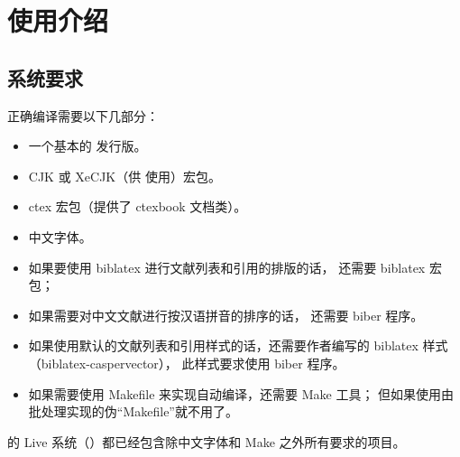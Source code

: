 %
%
%
%

\chapter{使用介绍}
\section{系统要求}\label{sec:req}

正确编译需要以下几部分：
\begin{itemize}
	\item 一个基本的  发行版。
	\item CJK 或 XeCJK（供  使用）宏包。
	\item ctex\supercite{ctex} 宏包（提供了 ctexbook 文档类）。
	\item 中文字体。
	\item 如果要使用 biblatex 进行文献列表和引用的排版的话，
		还需要 biblatex\supercite{biblatex} 宏包；
	\item 如果需要对中文文献进行按汉语拼音的排序的话，
		还需要 biber\supercite{biber} 程序。
	\item 如果使用默认的文献列表和引用样式的话，还需要作者编写的 biblatex 样式
		（biblatex-caspervector\supercite{biblatex-caspervector}），
		此样式要求使用 biber 程序。
	\item 如果需要使用 Makefile 来实现自动编译，还需要 Make 工具；
		但如果使用由批处理实现的伪“Makefile”就不用了。
\end{itemize}

的  Live 系统（）都已经包含除中文字体和 Make 之外所有要求的项目。%

